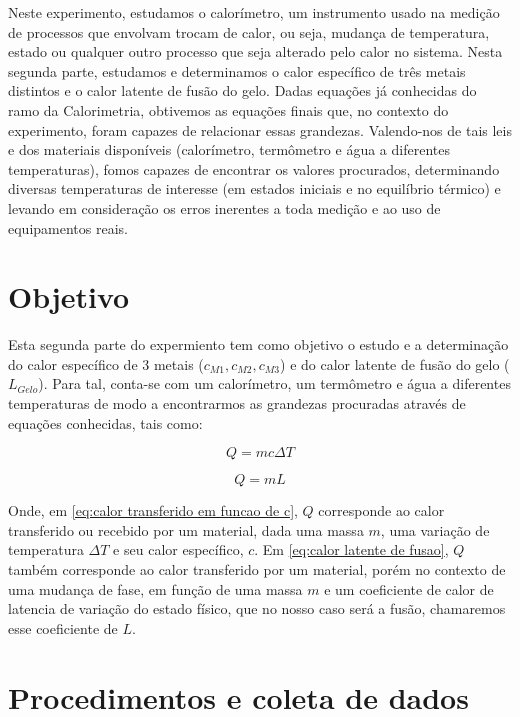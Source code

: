 \documentclass[a4paper]{article}
\begin{document}
	Neste experimento, estudamos o calorímetro, um instrumento usado na	medição de processos que envolvam trocam de calor, ou seja, mudança	de temperatura, estado ou qualquer outro processo que seja alterado pelo calor no sistema.
	Nesta segunda parte, estudamos e determinamos o calor específico de	três metais distintos e o calor latente de fusão do gelo. Dadas equações já conhecidas do ramo da Calorimetria, obtivemos as equações finais que, no contexto do experimento, foram capazes de relacionar essas grandezas. Valendo-nos de tais leis e dos materiais disponíveis (calorímetro, termômetro e água a diferentes temperaturas), fomos capazes de encontrar os valores procurados, determinando diversas temperaturas de interesse (em estados iniciais e no equilíbrio térmico) e levando em consideração os erros inerentes a toda medição e ao uso de equipamentos reais.

\section{Objetivo}

	Esta segunda parte do expermiento tem como objetivo o estudo e a determinação do calor específico de 3 metais ($c_{M1},c_{M2},c_{M3}$) e do calor latente de fusão do gelo ($L_{Gelo}$). Para tal, conta-se com um calorímetro, um termômetro e água a diferentes temperaturas de modo a encontrarmos as grandezas procuradas através de equações conhecidas,	tais como:

		\begin{equation}
			Q=mc\Delta T
			\label{eq:calor transferido em funcao de c}
		\end{equation}


		\begin{equation}
			Q=mL
			\label{eq:calor latente de fusao}
		\end{equation}


	Onde, em \eqref{eq:calor transferido em funcao de c}, $Q$ corresponde ao calor transferido ou recebido por um material, dada uma massa $m$,	uma variação de temperatura $\Delta T$ e seu calor específico, $c$.	Em \eqref{eq:calor latente de fusao}, $Q$ também corresponde ao calor transferido por um material, porém no contexto de uma mudança de fase, em função de uma massa $m$ e um coeficiente de calor de latencia de variação do estado físico, que no nosso caso será a fusão, chamaremos esse coeficiente de $L$.

\section{Procedimentos e coleta de dados}
	
\end{document}
